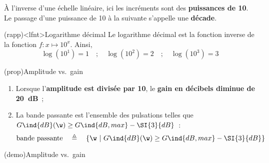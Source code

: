 \documentclass[../../main/main.tex]{subfiles}
\begin{document}
À l'inverse d'une échelle linéaire, ici les incréments sont des
\textbf{puissances de 10}. Le passage d'une puissance de 10 à la suivante
s'appelle une \textbf{décade}.

\begin{tcb*}(rapp)<lfnt>{Logarithme décimal}
	Le logarithme décimal est la fonction inverse de la fonction $f:x\mapsto
		10^{x}$. Ainsi,
	\[
		\log(10^{1}) = 1
		\quad ; \quad
		\log (10^{2}) = 2
		\quad ; \quad
		\log (10^{3}) = 3
	\]
\end{tcb*}

\begin{tcb*}(prop){Amplitude vs.\ gain}
	\begin{enumerate}
		\item Lorsque l'\textbf{amplitude est divisée par 10}, le \textbf{gain en
			      décibels diminue de \SI{20}{dB}}~;
		\item La bande passante est l'ensemble des pulsations telles que
		      $G\ind{dB}(\w) \geq G\ind{dB,max} - \SI{3}{dB}$~:
		      \[
			      \text{bande passante}
			      \quad \triangleq \quad
			      \{\w ~|~ G\ind{dB}(\w) \geq G\ind{dB, max}-\SI{3}{dB}\}
		      \]
	\end{enumerate}
\end{tcb*}
\begin{tcb*}[sidebyside](demo){Amplitude vs.\ gain}
	\begin{enumerate}
		\mitem
		\vspace{-15pt}
	\end{enumerate}
	\tcblower
	\begin{enumerate}[start=2]
		\mitem
		\psw{
			\small
			\begin{align*}
				\abs{\Hu(\w)}           & \geq \frac{\abs{\Hu}_{\max}}{\sqrt{2}}
				\\\Lra
				20 \log (\abs{\Hu(\w)}) & \geq 20 \log (\frac{\abs{\Hu}_{\max}}{\sqrt{2}})
				\\\Lra
				G\ind{dB}(\w)           & \geq
				\underbracket[1pt]{20 \log (\abs{\Hu}_{\max})}_{= G\ind{dB, max}} -
				\underbracket[1pt]{20 \log (\sqrt{2})}_{= \SI{3}{dB}}
				\qed
			\end{align*}
			\vspace{-15pt}
		}
	\end{enumerate}
\end{tcb*}
\end{document}
